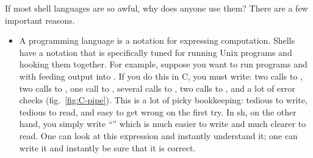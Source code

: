 If most shell languages are so awful, why does anyone use them?
There are a few important reasons.
\begin{itemize}
\item 
  A programming language is a notation for expressing computation.  Shells
  have a notation that is specifically tuned for running Unix programs and
  hooking them together. For example, suppose you want to run programs
   and  with  feeding output into . If you do
  this in C, you must write: two calls to , two calls to
  , one call to , several calls to , 
  two calls to , and a lot of error checks (fig.~\ref{fig:C-pipe}). 
  This is a lot of picky bookkeeping: tedious to write, tedious to read, 
  and easy to get wrong on the first try. In sh, on the other hand, 
  you simply write ``'' which is much easier to write and 
  much clearer to read.
  One can look at this expression and instantly understand it; 
  one can write it and instantly be sure that it is correct.

\begin{figure}
\end{figure}


\end{itemize}
